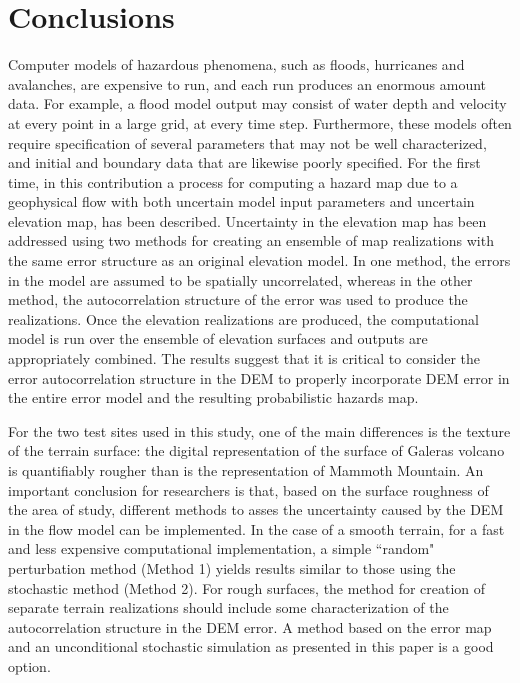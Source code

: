 \documentclass[12pt]{article}
\begin{document}
\section{Conclusions}

Computer models of hazardous phenomena, such as floods, hurricanes and avalanches, are 
 expensive to run, and each run produces an enormous amount data. For example, a flood 
model output may consist of water depth and velocity at every point in a large grid, at every   
time step. Furthermore, these models often require specification of several parameters that may not be 
well characterized, and initial and boundary data that are likewise poorly specified. 
For the first time, in this contribution a process for computing a hazard map due to a geophysical flow with both uncertain model
input parameters and uncertain elevation map, has been described. Uncertainty in the elevation map has been addressed using two methods for creating an ensemble of map realizations with the same error structure as an original elevation model.  In one method, the errors in the model are assumed to be spatially uncorrelated, whereas in the other method, the autocorrelation structure of the error was used to produce the realizations. Once the elevation realizations are produced, the computational model is run over the ensemble of elevation surfaces and outputs are appropriately combined.  The results suggest that it is critical to consider the error autocorrelation structure in the DEM to properly incorporate DEM error in the entire error model and the resulting probabilistic hazards map.

For the two test sites used in this study, one of the main differences is 
the texture of the terrain surface: the digital representation of the surface of Galeras volcano is quantifiably rougher than is the representation of Mammoth Mountain.
An important conclusion for researchers is that, based on the 
surface roughness of the area of study, different methods to asses the uncertainty caused by the DEM
in the flow model can be implemented. In the case of a smooth terrain, for a fast and 
less expensive computational implementation, a simple ``random" perturbation 
method (Method 1) yields results similar to those using the stochastic method (Method 2).
For rough surfaces, the method for creation of separate terrain realizations should include some characterization of the autocorrelation structure in the DEM error.  A 
method based on the error map and an unconditional stochastic simulation as 
presented in this paper is a good option.
\end{document}
